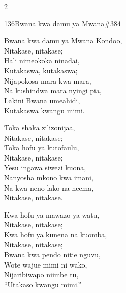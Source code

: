 \begin{multicols}{2}
\begin{hymn}{136}{Bwana kwa damu ya Mwana}{\#384}
\begin{stanza}
Bwana kwa damu ya Mwana Kondoo,\\
Nitakase, nitakase;\\
Hali nimeokoka ninadai,\\
Kutakaswa, kutakaswa;\\
Nijapokosa mara kwa mara,\\
Na kushindwa mara nyingi pia,\\
Lakini Bwana umeahidi,\\
Kutakaswa kwangu mimi.
\end{stanza}
\begin{stanza}
Toka shaka zilizonijaa,\\
Nitakase, nitakase;\\
Toka hofu ya kutofaulu,\\
Nitakase, nitakase;\\
Yesu ingawa siwezi kuona,\\
Nanyosha mkono kwa imani,\\
Na kwa neno lako na neema,\\
Nitakase, nitakase.
\end{stanza}
\begin{stanza}
Kwa hofu ya mawazo ya watu,\\
Nitakase, nitakase;\\
Kwa hofu ya kunena na kuomba,\\
Nitakase, nitakase;\\
Bwana kwa pendo nitie nguvu,\\
Wote wajue mimi ni wako,\\
Nijaribiwapo niimbe tu,\\
``Utakaso kwangu mimi.''
\end{stanza}
\end{hymn}


\end{multicols}
